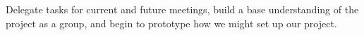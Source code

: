 Delegate tasks for current and future meetings, build a base understanding of the project as a group, and begin to prototype how we might set up our project.